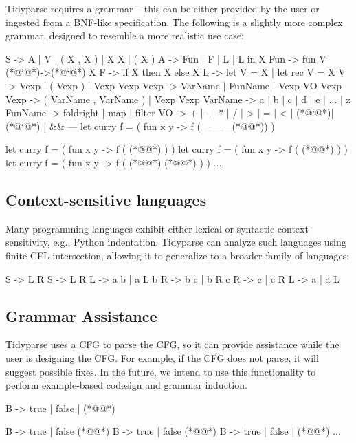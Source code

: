 \documentclass[sigplan,nonacm]{acmart}\settopmatter{printfolios=false,printccs=false,printacmref=false}
\begin{document}
Tidyparse requires a grammar -- this can be either provided by the user or ingested from a BNF-like specification. The following is a slightly more complex grammar, designed to resemble a more realistic use case:

\begin{tidyinput}
S -> A | V | ( X , X ) | X X | ( X )
A -> Fun | F | L | L in X
Fun -> fun V (*@`@*)->(*@`@*) X
F -> if X then X else X
L -> let V = X | let rec V = X
V -> Vexp | ( Vexp ) | Vexp Vexp
Vexp -> VarName | FunName | Vexp VO Vexp
Vexp -> ( VarName , VarName ) | Vexp Vexp
VarName -> a | b | c | d | e | ... | z
FunName -> foldright | map | filter
VO ->  + | - | * | / | > | = | < | (*@`@*)||(*@`@*) | &&
---
let curry f = ( fun x y -> f ( _ _ _(*@\caret{ }@*)) )
\end{tidyinput}
\begin{tidyoutput}
let curry f = ( fun x y -> f ( (*@@*) ) )
let curry f = ( fun x y -> f ( (*@@*) ) )
let curry f = ( fun x y -> f ( (*@@*) (*@@*) ) )
...
\end{tidyoutput}

\subsection{Context-sensitive languages}

Many programming languages exhibit either lexical or syntactic context-sensitivity, e.g., Python indentation. Tidyparse can analyze such languages using finite CFL-intersection, allowing it to generalize to a broader family of languages:

\begin{tidyinput}
S -> L R                  S -> L R
L -> a b | a L b          R -> b c | b R c
R -> c | c R              L -> a | a L
\end{tidyinput}

\subsection{Grammar Assistance}

Tidyparse uses a CFG to parse the CFG, so it can provide assistance while the user is designing the CFG. For example, if the CFG does not parse, it will suggest possible fixes. In the future, we intend to use this functionality to perform example-based codesign and grammar induction.

\begin{tidyinput}
B -> true | false | (*@\caret{ }@*)
\end{tidyinput}
\begin{tidyoutput}
B -> true | false (*@\hlred{ }@*)
B -> true | false (*@@*)
B -> true | false | (*@@*)
...
\end{tidyoutput}
\end{document}

